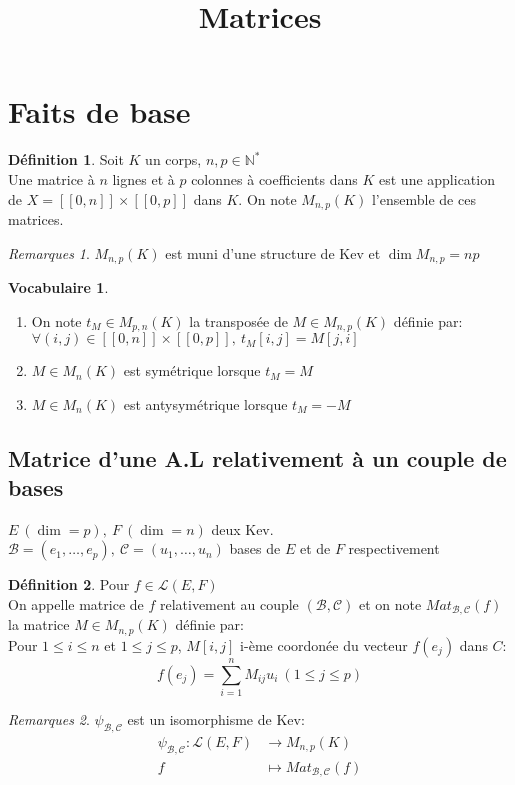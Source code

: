 \documentclass[fleqn]{article}
\title{Matrices}
\date{}
\theoremstyle{definition} \newtheorem*{defi}{D\'efinition}
\theoremstyle{definition} \newtheorem*{theo}{Th\'eor\`eme}
\theoremstyle{definition} \newtheorem*{coro}{Corollaire}
\theoremstyle{definition} \newtheorem*{nota}{Notation}
\theoremstyle{definition} \newtheorem*{vocab}{Vocabulaire}
\theoremstyle{remark} \newtheorem*{rqs}{Remarques}
\theoremstyle{definition} \newtheorem*{prop}{Propri\'et\'e}
\begin{document}
\maketitle

\section{Faits de base}
\begin{defi} Soit $K$ un corps, $n,p \in \mathbb{N}^*$\\
	Une matrice \`a $n$ lignes et \`a $p$ colonnes \`a coefficients dans $K$ est une application de $X = [\![0,n]\!]\times[\![0,p]\!]$ dans
	$K$. On note $M_{n,p}(K)$ l'ensemble de ces matrices.

	\begin{rqs} $M_{n,p}(K)$ est muni d'une structure de Kev et $\dim M_{n,p} = np$
	\end{rqs}
\end{defi}

\begin{vocab} $ $
	\begin{enumerate}
		\item On note $t_M \in M_{p,n}(K)$ la transpos\'ee de $M \in M_{n,p}(K)$ d\'efinie par: $\forall (i,j) \in
		[\![0,n]\!]\times[\![0,p]\!],\ t_M[i,j] = M[j,i]$
		\item $M \in M_n(K)$ est sym\'etrique lorsque $t_M = M$
		\item $M \in M_n(K)$ est antysym\'etrique lorsque $t_M = -M$
	\end{enumerate}
\end{vocab}

\subsection{Matrice d'une A.L relativement à un couple de bases}
$E\ (\dim = p),\ F\ (\dim = n)$ deux Kev.\\ $\mathscr{B} = (e_1, \hdots, e_p),\ \mathscr{C} = (u_1, \hdots, u_n)$ bases de $E$ et
de $F$ respectivement
\begin{defi} Pour $f \in \mathscr{L}(E,F)$\\
	On appelle matrice de $f$ relativement au couple $(\mathscr{B},\mathscr{C})$ et on note $Mat_{\mathscr{B},\mathscr{C}}(f)$ la matrice
	$M \in M_{n,p}(K)$ d\'efinie par:\\ Pour $1 \leq i \leq n$ et $1 \leq j \leq p$, $M[i,j]$ i-\`eme coordon\'ee du vecteur $f(e_j)$ dans $C$: \\
	\[f(e_j) = \sum_{i=1}^n M_{ij} u_i\ (1\leq j \leq p)\]

\begin{rqs} $\psi_{\mathscr{B},\mathscr{C}}$ est un isomorphisme de Kev:
	\begin{align*}
		\psi_{\mathscr{B},\mathscr{C}}: \mathscr{L}(E,F) &\rightarrow M_{n,p}(K)\\
		f & \mapsto Mat_{\mathscr{B},\mathscr{C}}(f)
	\end{align*}
\end{rqs}
\end{defi}
\end{document}
